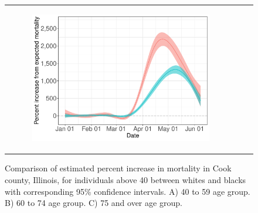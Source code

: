\documentclass[11pt]{article}
\begin{document}
\begin{figure}[ht]
\begin{tabular}{lll}
\begin{subfigure}[t]{0.3\linewidth}
		\includegraphics[width=1\linewidth]{figs/figure-3c-cook-75-above.pdf}
	\end{subfigure}\\
	\end{tabular}
	\caption{Comparison of estimated percent increase in mortality in Cook county, Illinois, for individuals above 40 between whites and blacks with corresponding 95\% confidence intervals. A) 40 to 59 age group. B) 60 to 74 age group. C) 75 and over age group.}
	\label{fig:cook-white-v-black}
\end{figure}
\end{document}
